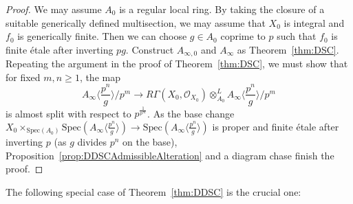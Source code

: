 \documentclass[10pt,reqno]{amsart}
\begin{document}
\begin{proof}
We may assume $A_0$ is a regular local ring. By taking the closure of a suitable generically defined multisection, we may assume that $X_0$ is integral and $f_0$ is generically finite. Then we can choose $g \in A_0$ coprime to $p$ such that $f_0$ is finite \'etale after inverting $pg$. Construct $A_{\infty,0}$ and $A_\infty$ as Theorem~\ref{thm:DSC}. Repeating the argument in the proof of Theorem~\ref{thm:DSC}, we must show that for fixed $m,n \geq 1$, the map 
\[ A_\infty \langle \frac{p^n}{g} \rangle/p^m \to R\Gamma(X_0,\mathcal{O}_{X_0}) \otimes^L_{A_0} A_\infty \langle \frac{p^n}{g} \rangle/p^m\]
is almost split with respect to $p^{\frac{1}{p^\infty}}$. As the base change $X_0 \times_{\mathrm{Spec}(A_0)} \mathrm{Spec}(A_\infty \langle \frac{p^n}{g} \rangle) \to \mathrm{Spec}(A_\infty \langle \frac{p^n}{g} \rangle)$ is proper and finite \'etale after inverting $p$ (as $g$ divides $p^n$ on the base), Proposition~\ref{prop:DDSCAdmissibleAlteration} and a diagram chase finish the proof.
 \end{proof}

The following special case of Theorem~\ref{thm:DDSC} is the crucial one:
\end{document}
